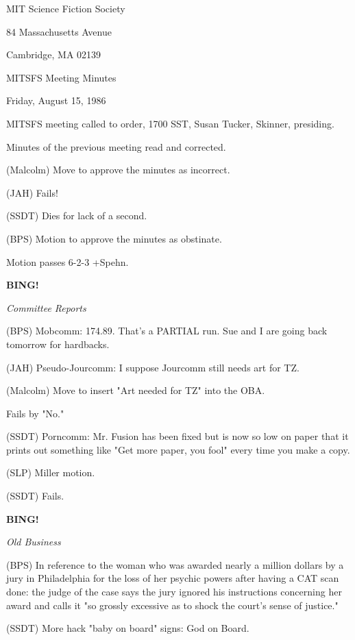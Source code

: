 \documentclass[12pt]{article}
\newcommand{\bing}{{\bf BING!} }
\newcommand{\goto}[1]{\bing \vskip 12pt \centerline{{\em{#1}}}}
\begin{document}
\begin{center}

MIT Science Fiction Society 

84 Massachusetts Avenue

Cambridge, MA 02139

\vspace{12pt}

MITSFS Meeting Minutes 

Friday, August 15, 1986

\end{center}
 
\vspace{18pt}

\setlength{\parskip}{6pt}

\noindent
MITSFS meeting called to order, 1700 SST,
Susan Tucker, Skinner, presiding.

Minutes of the previous meeting read and corrected.

(Malcolm) Move to approve the minutes as incorrect.

(JAH) Fails!

(SSDT) Dies for lack of a second.

(BPS) Motion to approve the minutes as obstinate.

Motion passes 6-2-3 +Spehn.

\goto{Committee Reports}

(BPS) Mobcomm: 174.89. That's a PARTIAL run. Sue and I are going back tomorrow for hardbacks.

(JAH) Pseudo-Jourcomm: I suppose Jourcomm still needs art for TZ.

(Malcolm) Move to insert "Art needed for TZ" into the OBA.

Fails by "No."

(SSDT) Porncomm: Mr. Fusion has been fixed but is now so low on paper that it prints out something like "Get more paper, you fool" every time you make a copy.

(SLP) Miller motion.

(SSDT) Fails.

\goto{Old Business}

(BPS) In reference to the woman who was awarded nearly a million dollars by a jury in Philadelphia for the loss of her psychic powers after having a CAT scan done: the judge of the case says the jury ignored his instructions concerning her award and calls it "so grossly excessive as to shock the court's sense of justice."

(SSDT) More hack "baby on board" signs: God on Board.
\end{document}
